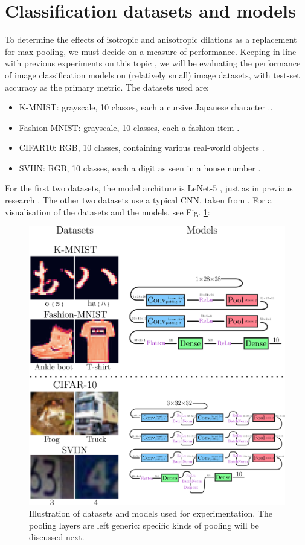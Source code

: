\documentclass[a4paper, 12pt]{report}
\begin{document}
\section{Classification datasets and models}
To determine the effects of isotropic and anisotropic dilations as a replacement for max-pooling, we must decide on a measure of performance. Keeping in line with previous experiments on this topic \cite{groenendijk2022morphpool, thierrybsc, koenbsc}, we will be evaluating the performance of image classification models on (relatively small) image datasets, with test-set accuracy as the primary metric.
The datasets used are:
\begin{itemize}
\setlength{\itemsep}{0pt}
	\item K-MNIST: grayscale, 10 classes, each a cursive Japanese character \cite{k-mnist}.. 
	\item Fashion-MNIST: grayscale, 10 classes, each a fashion item \cite{fashion-mnist}.
	\item CIFAR10: RGB, 10 classes, containing various real-world objects \cite{cifar10}.
	\item SVHN:  RGB, 10 classes, each a digit as seen in a house number \cite{svhn}.
\end{itemize}
For the first two datasets, the model architure is LeNet-5 \cite{lenet5}, just as in previous research \cite{thierrybsc}.
The other two datasets use a typical CNN, taken from \cite{model-cifar}.
For a visualisation of the datasets and the models, see Fig. \ref{fig:datasets}:
\begin{figure}[h!]
	\center
  \includegraphics[width=1\textwidth]{figures/datasets.png}
  \caption{Illustration of datasets and models used for experimentation.
  The pooling layers are left generic: specific kinds of pooling will be discussed next. }
  \label{fig:datasets}
\end{figure}
\end{document}
